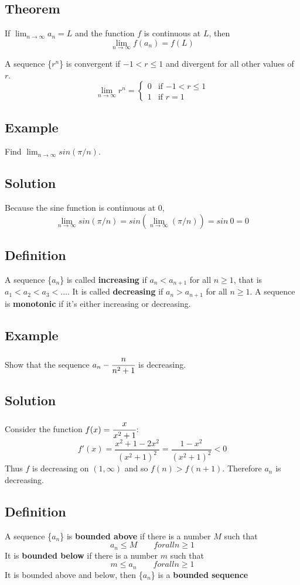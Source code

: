 \subsection*{Theorem}
If $\lim_{n \to \infty}a_n=L$ and the function $f$ is continuous at $L$, then
$$ \lim_{n \to \infty}f(a_n) = f(L) $$

A sequence \{$r^n$\} is convergent if $-1<r\leq1$ and divergent for all other values of $r$.
$$ \lim_{n \to \infty}r^n =
    \begin{cases}
        0 & \text{if $-1<r\leq1$} \\
        1 & \text{if $r=1$}
    \end{cases} $$

\subsection*{Example}
Find $\lim_{n\to \infty}sin(\pi /n)$.

\subsection*{Solution}
Because the sine function is continuous at 0,
$$\lim_{n\to \infty}sin(\pi /n)=sin\left(\lim_{n\to \infty}(\pi /n)\right)=sin\:0=0$$

\subsection*{Definition}
A sequence \{$a_n$\} is called \textbf{increasing} if $a_n < a_{n+1}$
for all $n \geq 1$, that is $a_1<a_2<a_3<\dots$. It is called \textbf{decreasing}
if $a_n>a_{n+1}$ for all $n \geq 1$. A sequence is \textbf{monotonic}
if it's either increasing or decreasing.

\subsection*{Example}
Show that the sequence $a_n-\cfrac{n}{n^2+1}$ is decreasing.

\subsection*{Solution}
Consider the function $f(x)=\cfrac{x}{x^2+1}$:
$$f'(x)=\frac{x^2+1-2x^2}{(x^2+1)^2}=\frac{1-x^2}{(x^2+1)^2}<0$$
Thus $f$ is decreasing on $(1,\infty)$ and so $f(n)>f(n+1)$. Therefore ${a_n}$ is decreasing.

\subsection*{Definition}
A sequence \{$a_n$\} is \textbf{bounded above} if there is a number $M$ such that
$$ a_n \leq M \qquad for all n \geq 1 $$
It is \textbf{bounded below} if there is a number $m$ such that
$$ m \leq a_n \qquad for all n \geq 1 $$
It is bounded above and below, then \{$a_n$\} is a \textbf{bounded sequence}

